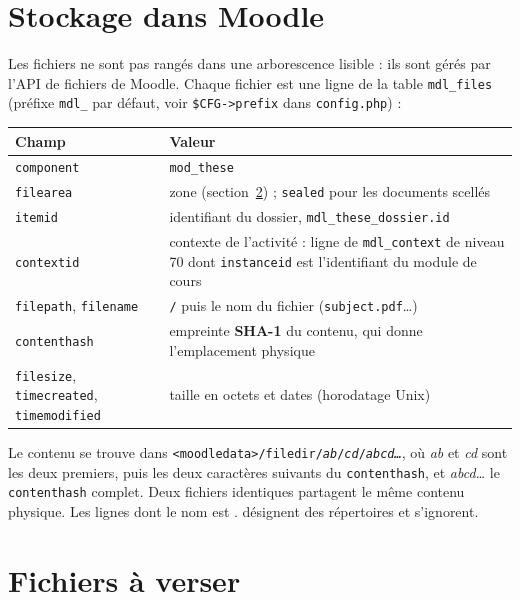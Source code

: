 \documentclass[11pt,a4paper]{article}
\begin{document}
\section{Stockage dans Moodle}\label{sec:stockage}

Les fichiers ne sont pas rangés dans une arborescence lisible : ils sont gérés par l'API de fichiers de
Moodle. Chaque fichier est une ligne de la table \texttt{mdl\_files} (préfixe \texttt{mdl\_} par
défaut, voir \texttt{\$CFG->prefix} dans \texttt{config.php}) :

\begin{center}
\small
\begin{tabularx}{\linewidth}{@{}l X@{}}
\toprule
\textbf{Champ} & \textbf{Valeur} \\
\midrule
\texttt{component} & \texttt{mod\_these} \\
\texttt{filearea} & zone (section~\ref{sec:zones}) ; \texttt{sealed} pour les documents scellés \\
\texttt{itemid} & identifiant du dossier, \texttt{mdl\_these\_dossier.id} \\
\texttt{contextid} & contexte de l'activité : ligne de \texttt{mdl\_context} de niveau 70 dont
\texttt{instanceid} est l'identifiant du module de cours \\
\texttt{filepath}, \texttt{filename} & \texttt{/} puis le nom du fichier (\texttt{subject.pdf}\ldots) \\
\texttt{contenthash} & empreinte \textbf{SHA-1} du contenu, qui donne l'emplacement physique \\
\texttt{filesize}, \texttt{timecreated}, \texttt{timemodified} & taille en octets et dates (horodatage Unix) \\
\bottomrule
\end{tabularx}
\end{center}

Le contenu se trouve dans
\texttt{<moodledata>/filedir/\textit{ab}/\textit{cd}/\textit{abcd\ldots}}, où \textit{ab} et
\textit{cd} sont les deux premiers, puis les deux caractères suivants du \texttt{contenthash}, et
\textit{abcd\ldots} le \texttt{contenthash} complet. Deux fichiers identiques partagent le même contenu
physique. Les lignes dont le nom est \og .\fg{} désignent des répertoires et s'ignorent.

\section{Fichiers à verser}\label{sec:zones}
\end{document}
